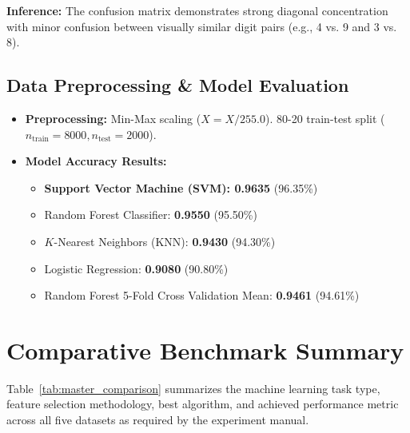 \documentclass[12pt,a4paper]{article}
\begin{document}
\textbf{Inference:}
The confusion matrix demonstrates strong diagonal concentration with minor confusion between visually similar digit pairs (e.g., 4 vs. 9 and 3 vs. 8).

\subsection{Data Preprocessing \& Model Evaluation}
\begin{itemize}
    \item \textbf{Preprocessing:} Min-Max scaling ($X = X / 255.0$). 80-20 train-test split ($n_{\text{train}}=8000, n_{\text{test}}=2000$).
    \item \textbf{Model Accuracy Results:}
    \begin{itemize}
        \item \textbf{Support Vector Machine (SVM): 0.9635} (96.35\%)
        \item Random Forest Classifier: \textbf{0.9550} (95.50\%)
        \item $K$-Nearest Neighbors (KNN): \textbf{0.9430} (94.30\%)
        \item Logistic Regression: \textbf{0.9080} (90.80\%)
        \item Random Forest 5-Fold Cross Validation Mean: \textbf{0.9461} (94.61\%)
    \end{itemize}
\end{itemize}

\section{Comparative Benchmark Summary}
Table~\ref{tab:master_comparison} summarizes the machine learning task type, feature selection methodology, best algorithm, and achieved performance metric across all five datasets as required by the experiment manual.
\end{document}
